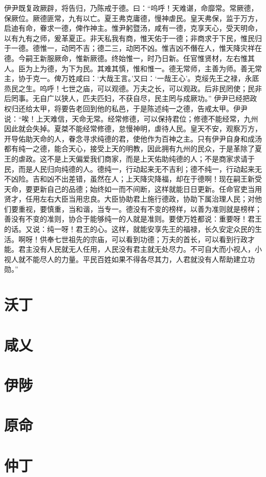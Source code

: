 \documentclass[a4paper,12pt,UTF8,twoside]{ctexbook}
\begin{document}
伊尹既复政厥辟，将告归，乃陈戒于德。曰：“呜呼！天难谌，命靡常。常厥德，保厥位。厥德匪常，九有以亡。夏王弗克庸德，慢神虐民。皇天弗保，监于万方，启迪有命，眷求一德，俾作神主。惟尹躬暨汤，咸有一德，克享天心，受天明命，以有九有之师，爰革夏正。非天私我有商，惟天佑于一德；非商求于下民，惟民归于一德。德惟一，动罔不吉；德二三，动罔不凶。惟吉凶不僭在人，惟天降灾祥在德。今嗣王新服厥命，惟新厥德。终始惟一，时乃日新。任官惟贤材，左右惟其人。臣为上为德，为下为民。其难其慎，惟和惟一。德无常师，主善为师。善无常主，协于克一。俾万姓咸曰：‘大哉王言。’又曰：‘一哉王心’。克绥先王之禄，永厎烝民之生。呜呼！七世之庙，可以观德。万夫之长，可以观政。后非民罔使；民非后罔事。无自广以狭人，匹夫匹妇，不获自尽，民主罔与成厥功。”
伊尹已经把政权归还给太甲，将要告老回到他的私邑，于是陈述纯一之德，告戒太甲。伊尹说：“唉！上天难信，天命无常。经常修德，可以保持君位；修德不能经常，九州因此就会失掉。夏桀不能经常修德，怠慢神明，虐待人民。皇天不安，观察万方，开导佑助天命的人，眷念寻求纯德的君，使他作为百神之主。只有伊尹自身和成汤都有纯一之德，能合天心，接受上天的明教，因此拥有九州的民众，于是革除了夏王的虐政。这不是上天偏爱我们商家，而是上天佑助纯德的人；不是商家求请于民，而是人民归向纯德的人。德纯一，行动起来无不吉利；德不纯一，行动起来无不凶险。吉和凶不出差错，虽然在人；上天降灾降福，却在于德啊！现在嗣王新受天命，要更新自己的品德；始终如一而不间断，这样就能日日更新。任命官吏当用贤才，任用左右大臣当用忠良。大臣协助君上施行德政，协助下属治理人民；对他们要重视，要慎重，当和谐，当专一。德没有不变的榜样，以善为准则就是榜样；善没有不变的准则，协合于能够纯一的人就是准则。要使万姓都说：重要呀！君王的话。又说：纯一呀！君王的心。这样，就能安享先王的福禄，长久安定众民的生活。啊呀！供奉七世祖先的宗庙，可以看到功德；万夫的首长，可以看到行政才能。君主没有人民就无人任用，人民没有君主就无处尽力。不可自大而小视人，小视人就不能尽人的力量。平民百姓如果不得各尽其力，人君就没有人帮助建立功勋。”
\chapter{沃丁}
\chapter{咸乂}
\chapter{伊陟}
\chapter{原命}
\chapter{仲丁}
\end{document}
